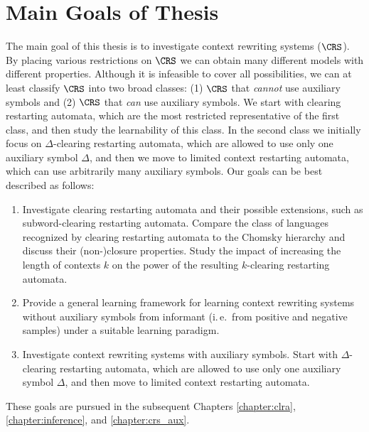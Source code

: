 \chapter{Main Goals of Thesis}\label{chapter:goals}

The main goal of this thesis is to investigate context rewriting systems ($\CRS$). By placing various restrictions on $\CRS$ we can obtain many different models with different properties. Although it is infeasible to cover all possibilities, we can at least classify $\CRS$ into two broad classes: (1) $\CRS$ that \emph{cannot} use auxiliary symbols and (2) $\CRS$ that \emph{can} use auxiliary symbols. We start with clearing restarting automata, which are the most restricted representative of the first class, and then study the learnability of this class. In the second class we initially focus on $\Delta$-clearing restarting automata, which are allowed to use only one auxiliary symbol $\Delta$, and then we move to limited context restarting automata, which can use arbitrarily many auxiliary symbols. Our goals can be best described as follows:
\begin{enumerate}
\item\label{goal:clra} Investigate clearing restarting automata and their possible extensions, such as subword-clearing restarting automata. Compare the class of languages recognized by clearing restarting automata to the Chomsky hierarchy and discuss their (non-)closure properties. Study the impact of increasing the length of contexts $k$ on the power of the resulting $k$-clearing restarting automata.
\item\label{goal:learning} Provide a general learning framework for learning context rewriting systems without auxiliary symbols from informant (i.\,e.\ from positive and negative samples) under a suitable learning paradigm.
\item\label{goal:aux} Investigate context rewriting systems with auxiliary symbols. Start with $\Delta$-clearing restarting automata, which are allowed to use only one auxiliary symbol $\Delta$, and then move to limited context restarting automata. 
\end{enumerate}
These goals are pursued in the subsequent Chapters \ref{chapter:clra}, \ref{chapter:inference}, and \ref{chapter:crs_aux}.